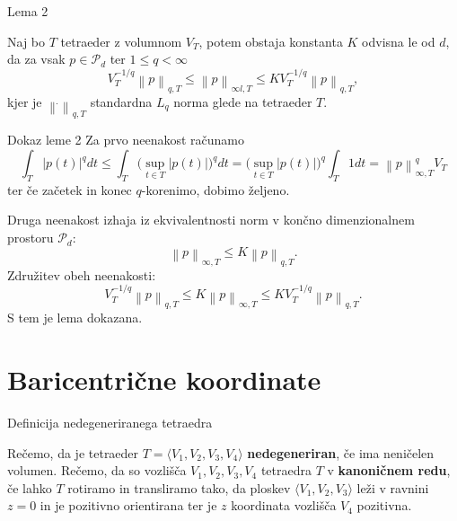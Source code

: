 \documentclass{beamer}
\begin{document}
\begin{frame}{Lema 2}
\begin{lemma}\label{lema_norma}
    Naj bo $T$ tetraeder z volumnom $V_T$, potem obstaja 
    konstanta $K$ odvisna le od $d$, da za vsak  $p \in \mathcal{P}_d$ ter $1 \le q < \infty$
    \begin{equation}
        V_T^{-1/q} \left\lVert p \right\rVert_{q,T} \le  \left\lVert p \right\rVert_{\infty l, T} \le K V_T^{-1/q} \left\lVert p \right\rVert_{q,T},
    \end{equation}
    kjer je $\left\lVert \dot{} \right\rVert_{q,T}$ standardna $L_q$ norma 
    glede na tetraeder $T$.
\end{lemma}
\end{frame}


\begin{frame}{Dokaz leme 2}
    Za prvo neenakost računamo
    \begin{equation*}
        \int_{T} |p(t)|^q dt \le 
        \int_{T} \bigg( \sup_{t \in T} |p(t)| \bigg) ^q dt
        = \big(\sup_{t \in T} |p(t)| \big)^q \int_{T}1dt 
        = \left\lVert p \right\rVert_{\infty , T}^{q} V_T
    \end{equation*}
    ter če začetek in konec $q$-korenimo, dobimo željeno.
    
    Druga neenakost izhaja iz ekvivalentnosti norm v končno dimenzionalnem prostoru $\mathcal{P}_d$:
    \[
        \left\lVert p \right\rVert_{\infty, T} \leq K \left\lVert p \right\rVert_{q,T}.
    \]
    Združitev obeh neenakosti:
    \[
        V_T^{-1/q} \left\lVert p \right\rVert_{q,T} \leq K \left\lVert p \right\rVert_{\infty, T} \leq K V_T^{-1/q} \left\lVert p \right\rVert_{q,T}.
    \]
    S tem je lema dokazana.
\end{frame}

\section{Baricentrične koordinate}
\begin{frame}{Definicija nedegeneriranega tetraedra}
 \begin{definition}
    Rečemo, da je tetraeder $T = \langle V_1, V_2, V_3, V_4 \rangle$ \textbf{nedegeneriran}, če ima neničelen volumen. Rečemo, da so vozlišča $V_1 , V_2 , V_3, V_4$ tetraedra $T$ v \textbf{kanoničnem redu}, če lahko $T$ rotiramo in transliramo  tako, da ploskev $\langle V_1, V_2, V_3\rangle$ leži v ravnini $z = 0$ in je pozitivno orientirana ter je $z$ koordinata vozlišča $V_4$ pozitivna.
\end{definition}
\end{frame}
\end{document}
